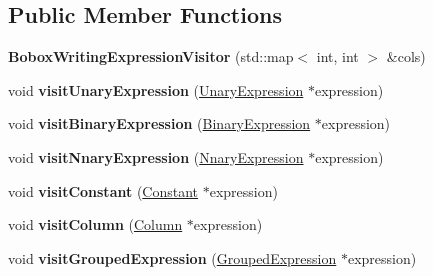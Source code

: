 \subsection*{Public Member Functions}
\begin{DoxyCompactItemize}
\item 
\hypertarget{class_bobox_writing_expression_visitor_a977d27ae446d613bc90fb6e29165504b}{{\bfseries Bobox\+Writing\+Expression\+Visitor} (std\+::map$<$ int, int $>$ \&cols)}\label{class_bobox_writing_expression_visitor_a977d27ae446d613bc90fb6e29165504b}

\item 
\hypertarget{class_bobox_writing_expression_visitor_abf4dc22d06dd87f35f577db194b69a71}{void {\bfseries visit\+Unary\+Expression} (\hyperlink{class_unary_expression}{Unary\+Expression} $\ast$expression)}\label{class_bobox_writing_expression_visitor_abf4dc22d06dd87f35f577db194b69a71}

\item 
\hypertarget{class_bobox_writing_expression_visitor_a4e7d193e7b5d361c67a0ee0b82628120}{void {\bfseries visit\+Binary\+Expression} (\hyperlink{class_binary_expression}{Binary\+Expression} $\ast$expression)}\label{class_bobox_writing_expression_visitor_a4e7d193e7b5d361c67a0ee0b82628120}

\item 
\hypertarget{class_bobox_writing_expression_visitor_ac66d4abc015382d70392acc6593196c3}{void {\bfseries visit\+Nnary\+Expression} (\hyperlink{class_nnary_expression}{Nnary\+Expression} $\ast$expression)}\label{class_bobox_writing_expression_visitor_ac66d4abc015382d70392acc6593196c3}

\item 
\hypertarget{class_bobox_writing_expression_visitor_aa51161e2a5c08a3f5ca37901fbcc572f}{void {\bfseries visit\+Constant} (\hyperlink{class_constant}{Constant} $\ast$expression)}\label{class_bobox_writing_expression_visitor_aa51161e2a5c08a3f5ca37901fbcc572f}

\item 
\hypertarget{class_bobox_writing_expression_visitor_a2547b638ff123190d33492ed3ce410ea}{void {\bfseries visit\+Column} (\hyperlink{class_column}{Column} $\ast$expression)}\label{class_bobox_writing_expression_visitor_a2547b638ff123190d33492ed3ce410ea}

\item 
\hypertarget{class_bobox_writing_expression_visitor_a12180fc75d31108cf8c542513e0f1db5}{void {\bfseries visit\+Grouped\+Expression} (\hyperlink{class_grouped_expression}{Grouped\+Expression} $\ast$expression)}\label{class_bobox_writing_expression_visitor_a12180fc75d31108cf8c542513e0f1db5}

\end{DoxyCompactItemize}
